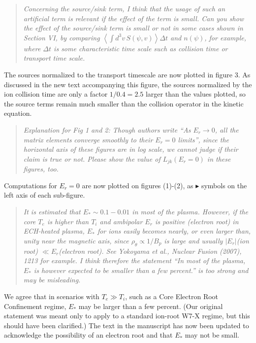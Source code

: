 \documentclass[11pt]{article}
\newenvironment{referee}{\begin{quote}\it\color{Blue}}{\end{quote}}
\begin{document}
\begin{referee}
Concerning the source/sink term, I think that the usage of such an artificial term is relevant if
the effect of the term is small. Can you show the effect of the source/sink term is small or not in
some cases shown in Section VI, by comparing $\left< \int d^3v\, S(\psi,v) \right> \Delta t$ and $n(\psi)$, for example, where
$\Delta t$ is some characteristic time scale such as collision time or transport time scale.
\end{referee}

The sources normalized to the transport timescale are now plotted in figure 3.
As discussed in the new text accompanying this figure, 
the sources normalized by the ion collision time are only a factor $1/0.4=2.5$ larger than the values plotted,
so the source terms remain much smaller than the collision operator in the kinetic equation.

\begin{referee}
Explanation for Fig 1 and 2: Though authors write ``As $E_r \to 0$, all the matrix elements converge
smoothly to their $E_r = 0$ limits'', since the horizontal axis of these figures are in log scale, we
cannot judge if their claim is true or not. Please show the value of $L_{jk}(E_r=0)$ in these figures,
too.
\end{referee}

Computations for $E_r=0$ are now plotted on figures (1)-(2), as $\blacktriangleright$ symbols on the left axis
of each sub-figure.

\begin{referee}
It is estimated that $E_* \sim 0.1 - 0.01$ in most of the plasma. However, if the core $T_e$ is higher than
$T_i$ and ambipolar $E_r$ is positive (electron root) in ECH-heated plasma, $E_*$ for ions easily becomes
nearly, or even larger than, unity near the magnetic axis, since $\rho_\theta \propto 1/B_p$ is large and usually
$|E_r|$(ion root) $\ll E_r$(electron root). See Yokoyama et al., Nuclear Fusion (2007), 1213 for example.
I think therefore the statement ``In most of the plasma, $E_*$ is however expected to be smaller
than a few percent.'' is too strong and may be misleading.
\end{referee}

We agree that in scenarios with $T_e \gg T_i$, such as a Core Electron Root Confinement regime,
$E_*$ may be larger than a few percent. (Our original statement
was meant only to apply to a standard ion-root W7-X regime,
but this should have been clarified.) The text in the manuscript has now been updated to acknowledge
the possibility of an electron root and that $E_*$ may not be small. 
\end{document}
